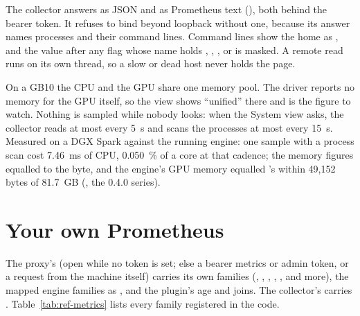 The collector answers  as JSON and  as Prometheus text (), both behind the bearer token. It refuses to bind beyond loopback without one, because its answer names processes and their command lines. Command lines show the home as \code{~}, and the value after any flag whose name holds , , ,  or  is masked. A remote read runs on its own thread, so a slow or dead host never holds the page.

On a GB10 the CPU and the GPU share one memory pool. The driver reports no memory for the GPU itself, so the view shows \enquote{unified} there and  is the figure to watch. Nothing is sampled while nobody looks: when the System view asks, the collector reads at most every 5~s and scans the processes at most every 15~s. Measured on a DGX Spark against the running engine: one sample with a process scan cost 7.46~ms of CPU, 0.050~\% of a core at that cadence; the memory figures equalled  to the byte, and the engine's GPU memory equalled 's within 49,152 bytes of 81.7~GB (\measured, the 0.4.0 series).

\section{Your own Prometheus}

The proxy's  (open while no token is set; else a bearer metrics or admin token, or a request from the machine itself) carries its own families (, , , , ,  and more), the mapped engine families as , and the plugin's age and joins. The collector's  carries . Table~\ref{tab:ref-metrics} lists every family registered in the code.
